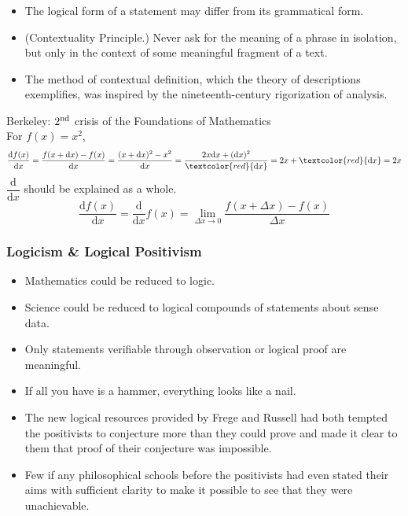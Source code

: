 \documentclass[UTF8,11pt,colorlinks,compress,openany]{beamer}%
\begin{document}
\begin{frame}\frametitle{}
\begin{itemize}
	\item The logical form of a statement may differ from its grammatical form.
	\item (Contextuality Principle.) Never ask for the meaning of a phrase in isolation, but only in the context of some meaningful fragment of a text.
	\item The method of contextual definition, which the theory of descriptions exemplifies, was inspired by the nineteenth-century rigorization of analysis.
\end{itemize}
Berkeley: $2\textsuperscript{nd}$ crisis of the Foundations of Mathematics\\
For $f(x)=x^2$,
\[\dfrac{\mathrm{d} f(x)}{\mathrm{d}x}=\dfrac{f(x+\mathrm{d}x)-f(x)}{\mathrm{d}x}=\dfrac{(x+\mathrm{d}x)^2-x^2}{\mathrm{d}x}=\dfrac{2x\mathrm{d}x+(\mathrm{d}x)^2}{\textcolor{red}{\mathrm{d}x}}=2x+\textcolor{red}{\mathrm{d}x}=2x\]
$\dfrac{\mathrm{d}}{\mathrm{d}x}$ should be explained as a whole.
\[\dfrac{\mathrm{d} f(x)}{\mathrm{d}x}=\dfrac{\mathrm{d}}{\mathrm{d}x}f(x)=\lim\limits_{\Delta x\to 0}\dfrac{f(x+\Delta x)-f(x)}{\Delta x}\]
\end{frame}

\begin{frame}\frametitle{Logicism \& Logical Positivism}
\begin{itemize}
	\item Mathematics could be reduced to logic.
	\item Science could be reduced to logical compounds of statements about sense data.
	\item Only statements verifiable through observation or logical proof are meaningful.
	\item If all you have is a hammer, everything looks like a nail.
	\item The new logical resources provided by Frege and Russell had both tempted the positivists to conjecture more than they could prove and made it clear to them that proof of their conjecture was impossible.
	\item Few if any philosophical schools before the positivists had even stated their aims with sufficient clarity to make it possible to see that they were unachievable.
\end{itemize}
\end{frame}
\end{document}
